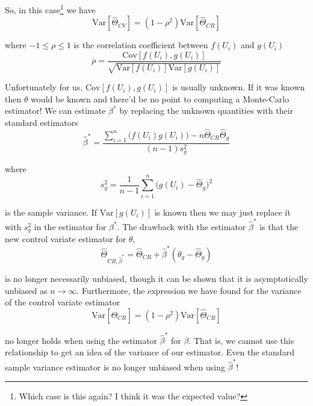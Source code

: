 \documentclass[12pt]{article}
\newlength\tindent
\renewcommand{\indent}{\hspace*{\tindent}}
\begin{document}
So, in this case\footnote{Which case is this again? I think it was the expected value?} we have
\begin{equation*}
	\mathrm{Var}[\hat{\Theta}_{CV}] = (1 - \rho^2)\mathrm{Var}[\hat{\Theta}_{CR}]
\end{equation*}

where $-1 \leq \rho \leq 1$ is the correlation coefficient between $f(U_i)$ and $g(U_i)$
\begin{equation*}
	\rho = \frac{\mathrm{Cov}[f(U_i),g(U_i)]}{\sqrt{\mathrm{Var}[f(U_i)]\mathrm{Var}[g(U_i)]}}
\end{equation*}

\indent Unfortunately for us, $\mathrm{Cov}[f(U_i), g(U_i)]$ is usually unknown. If it was known then $\theta$ would be known and there'd be no point to computing a Monte-Carlo estimator! We can estimate $\beta^*$ by replacing the unknown quantities with their standard estimators
\begin{equation*}
	\hat{\beta}^* = \frac{\sum^n_{i=1}\big(f(U_i)g(U_i)\big) - n\hat{\Theta}_{CR}\hat{\Theta}_g }{(n-1)s^2_g}
\end{equation*}

where
\begin{equation*}
	s^2_g = \frac{1}{n-1} \sum^n_{i=1} \Big(g(U_i) - \hat{\Theta}_{g} \Big)^2
\end{equation*}

is the sample variance. If $\mathrm{Var}[g(U_i)]$ is known then we may just replace it with $s^2_g$ in the estimator for $\beta^*$. The drawback with the estimator $\hat{\beta}^*$ is that the new control variate estimator for $\theta$,
\begin{equation*}
	\hat{\Theta}_{CR,\hat{\beta}^*} = \hat{\Theta}_{CR} + \hat{\beta}^*(\theta_g - \hat{\Theta}_g)
\end{equation*}

is no longer necessarily unbiased, though it can be shown that it is asymptotically unbiased as $n \to \infty$. Furthermore, the expression we have found for the variance of the control variate estimator
\begin{equation*}
	\mathrm{Var}[\hat{\Theta}_{CR}] = (1 - \rho^2)\mathrm{Var}[\hat{\Theta}_{CR}]
\end{equation*}

no longer holds when using the estimator $\hat{\beta}^*$ for $\beta$. That is, we cannot use this relationship to get an idea of the variance of our estimator. Even the standard sample variance estimator is no longer unbiased when using $\hat{\beta}^*$! \\
\end{document}
